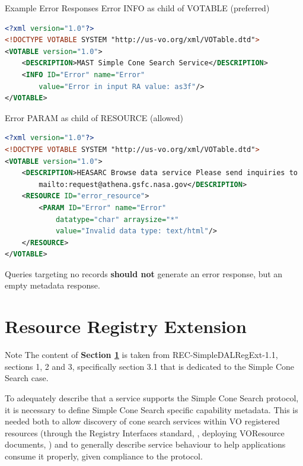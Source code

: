 \documentclass[11pt,a4paper]{ivoa}
\begin{document}
\begin{bigdescription} 
	\item[Example Error Responses] Error INFO as child of VOTABLE (preferred)\\

\begin{lstlisting}[language=XML,basicstyle=\footnotesize]
<?xml version="1.0"?>
<!DOCTYPE VOTABLE SYSTEM "http://us-vo.org/xml/VOTable.dtd">
<VOTABLE version="1.0">
	<DESCRIPTION>MAST Simple Cone Search Service</DESCRIPTION>
	<INFO ID="Error" name="Error"
		value="Error in input RA value: as3f"/>
</VOTABLE> 
\end{lstlisting} 

Error PARAM as child of RESOURCE (allowed)

\begin{lstlisting}[language=XML,basicstyle=\footnotesize]
<?xml version="1.0"?>
<!DOCTYPE VOTABLE SYSTEM "http://us-vo.org/xml/VOTable.dtd">
<VOTABLE version="1.0">
	<DESCRIPTION>HEASARC Browse data service Please send inquiries to
		mailto:request@athena.gsfc.nasa.gov</DESCRIPTION>
	<RESOURCE ID="error_resource">
		<PARAM ID="Error" name="Error" 
			datatype="char" arraysize="*" 
			value="Invalid data type: text/html"/>
	</RESOURCE>
</VOTABLE>
\end{lstlisting}

\end{bigdescription}

Queries targeting no records \textbf{should not} generate an error
response, but an empty metadata response.

\section{Resource Registry Extension} \label{sec:regext}

\begin{admonition}{Note} The content of \textbf{Section
\ref{sec:regext}} is taken from REC-SimpleDALRegExt-1.1, sections 1, 2
and 3, specifically section 3.1 that is dedicated to the Simple Cone
Search case.  \end{admonition}

To adequately describe that a service supports the Simple Cone Search
protocol, it is necessary to define Simple Cone Search specific
capability metadata. This is needed both to allow discovery of cone
search services within VO registered resources (through the Registry
Interfaces standard, \citet{2018ivoa.spec.0723D}, deploying VOResource documents,
\citet{2018ivoa.spec.0625P}) and to generally describe service behaviour to help
applications consume it properly, given compliance to the protocol.
\end{document}
